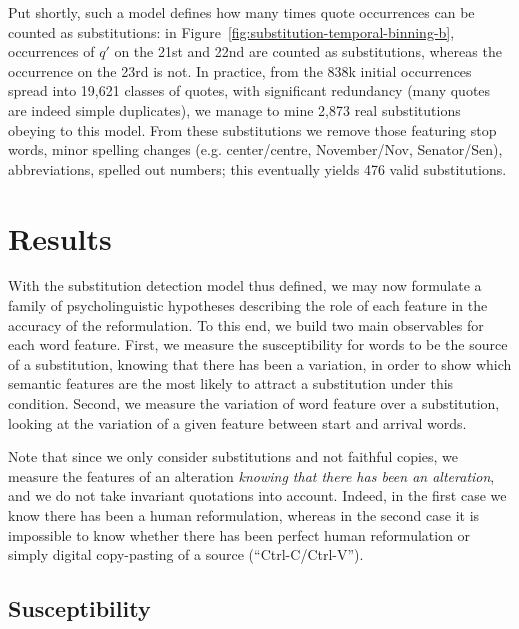 Put shortly, such a model defines how many times quote occurrences can be counted as substitutions: in Figure~\ref{fig:substitution-temporal-binning-b}, occurrences of $q'$ on the 21st and 22nd are counted as substitutions, whereas the occurrence on the 23rd is not.  In practice, from the 838k initial occurrences spread into 19,621 classes of quotes, with significant redundancy (many quotes are indeed simple duplicates), we manage to mine 2,873 real substitutions obeying to this model. From these substitutions we remove those featuring stop words, minor spelling changes (e.g. center/centre, November/Nov, Senator/Sen), abbreviations, spelled out numbers; this eventually yields 476 valid substitutions. 


\section{Results}\label{sec:results}

With the substitution detection model thus defined, we may now formulate a family of psycholinguistic hypotheses describing the role of each feature in the accuracy of the reformulation.  To this end, we build two main observables for each word feature.  
First, we measure the susceptibility for words to be the source of a substitution, knowing that there has been a variation, in order to show which semantic features are the most likely to attract a substitution under this condition. Second, we measure the variation of word feature over a substitution, looking at the variation of a given feature between start and arrival words.

Note that since we only consider substitutions and not faithful copies, we measure the features of an alteration \emph{knowing that there has been an alteration}, and we do not take invariant quotations into account.  Indeed, in the first case we know there has been a human reformulation, whereas in the second case it is impossible to know whether there has been perfect human reformulation or simply digital copy-pasting of a source (``{\sc Ctrl-C}/{\sc Ctrl-V}'').

\subsection{Susceptibility}

